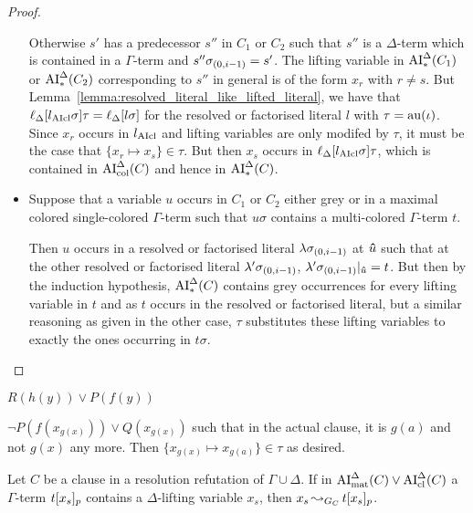 \documentclass[,%
	draft=false,%
	numbers=noendperiod
	11pt,
	a4paper,
	oneside,%
	openany,
]{memoir}
\begin{document}
\begin{proof}
\begin{itemize}
			Otherwise $s'$ has a predecessor $s''$ in $C_1$ or $C_2$ such that $s''$ is a $\Delta$-term which is contained in a $\Gamma$-term and $s''\sigma_{(0,i-1)} = s'$.
			The lifting variable in $\operatorname{AI}_\mathrm{*}^\Delta(C_1)$ or $\operatorname{AI}_\mathrm{*}^\Delta(C_2)$ corresponding to $s''$ in general is of the form $x_r$ with $r\neq s$.
			But Lemma~\ref{lemma:resolved_literal_like_lifted_literal}, we have that $\ell_{\Delta}[l_{\operatorname{AIcl}}\sigma]\tau = \ell_{\Delta}[l\sigma]$ for the resolved or factorised literal $l$ with $\tau = \operatorname{au}(\iota)$.
			Since $x_r$ occurs in $l_{\operatorname{AIcl}}$ and lifting variables are only modifed by $\tau$, it must be the case that $\{x_r \mapsto x_s\}\in \tau$.
			But then $x_s$ occurs in $\ell_{\Delta}[l_{\operatorname{AIcl}}\sigma]\tau$, which is contained in $\operatorname{AI}_\mathrm{col}^\Delta(C)$ and hence in $\operatorname{AI}_\mathrm{*}^\Delta(C)$.


		\item
			Suppose that a variable $u$ occurs in $C_1$ or $C_2$ either grey or in a maximal colored single-colored $\Gamma$-term such that $u\sigma$ contains a multi-colored $\Gamma$-term $t$.

			Then $u$ occurs in a resolved or factorised literal $\lambda\sigma_{(0,i-1)}$ at $\bm\hat u$ such that at the other resolved or factorised literal $\lambda'\sigma_{(0,i-1)}$, $\lambda'\sigma_{(0,i-1)}|_{\bm\hat u} = t$.
			But then by the induction hypothesis, $\operatorname{AI}_\mathrm{*}^\Delta(C)$ contains grey occurrences for every lifting variable in $t$ and as $t$ occurs in the resolved or factorised literal, but a similar reasoning as given in the other case, $\tau$ substitutes these lifting variables to exactly the ones occurring in $t\sigma$.
			\qedhere
	\end{itemize}


\end{proof}

\begin{exa}
	$ R(h(y)) \lor P(f(y))$

	$ \lnot P(f(x_{g(x)})) \lor Q(x_{g(x)}) $ such that in the actual clause, it is $g(a)$ and not $g(x)$ any more.
	Then $ \{ x_{g(x)} \mapsto x_{g(a)} \} \in \tau $ as desired.
\end{exa}

\clearpage

\begin{clemma}
	Let $C$ be a clause in a resolution refutation of $\Gamma \cup \Delta$.
	If in $\operatorname{AI}_\mathrm{mat}^\Delta(C) \lor \operatorname{AI}_\mathrm{cl}^\Delta(C)$	a $\Gamma$-term $t{[x_s]_{p}}$ contains a $\Delta$-lifting variable $x_s$,
	then $x_s \operatorname{\leadsto}_{G_C} t{[x_s]_{p}}$.
\end{clemma}
\end{document}

